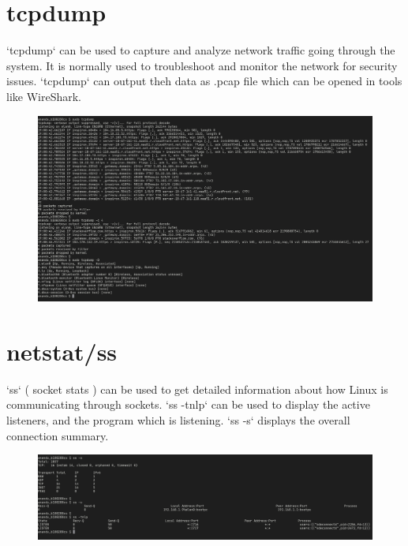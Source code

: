 \documentclass{article}
\begin{document}
\section{tcpdump}
`tcpdump` can be used to capture and analyze network traffic going through the system. It is normally used to troubleshoot and monitor the network for security issues. `tcpdump` can output theh data as .pcap file which can be opened in tools like WireShark.
\begin{figure}[ht]
    \centering
    \includegraphics[width=1.0\textwidth]{images/tcpdump.png}
\end{figure}
\pagebreak

\section{netstat/ss}
`ss` ( socket stats ) can be used to get detailed information about how Linux is communicating through sockets. `ss -tnlp` can be used to display the active listeners, and the program which is listening. `ss -s` displays the overall connection summary.
\begin{figure}[ht]
    \centering
    \includegraphics[width=1.0\textwidth]{images/ss.png}
\end{figure}
\pagebreak
\end{document}
